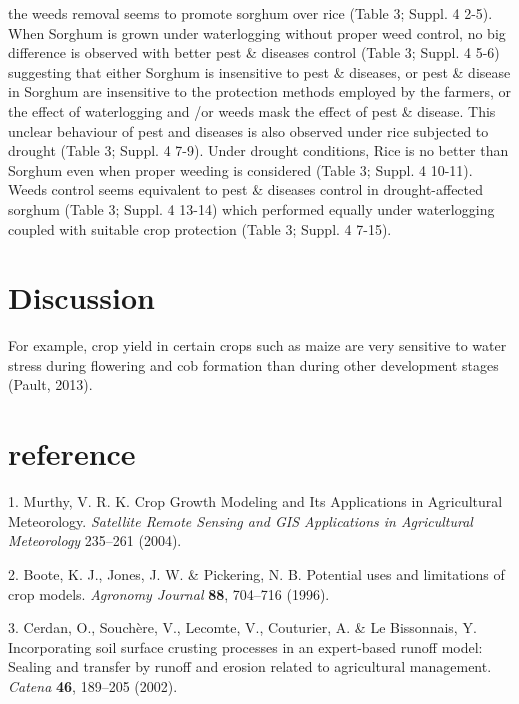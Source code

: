 \documentclass[12pt,oneside]{article}
\begin{document}
the weeds removal seems to promote sorghum over rice (Table 3; Suppl. 4
2-5). When Sorghum is grown under waterlogging without proper weed
control, no big difference is observed with better pest \& diseases
control (Table 3; Suppl. 4 5-6) suggesting that either Sorghum is
insensitive to pest \& diseases, or pest \& disease in Sorghum are
insensitive to the protection methods employed by the farmers, or the
effect of waterlogging and /or weeds mask the effect of pest \& disease.
This unclear behaviour of pest and diseases is also observed under rice
subjected to drought (Table 3; Suppl. 4 7-9). Under drought conditions,
Rice is no better than Sorghum even when proper weeding is considered
(Table 3; Suppl. 4 10-11). Weeds control seems equivalent to pest \&
diseases control in drought-affected sorghum (Table 3; Suppl. 4 13-14)
which performed equally under waterlogging coupled with suitable crop
protection (Table 3; Suppl. 4 7-15).

\hypertarget{discussion}{%
\section{Discussion}\label{discussion}}

For example, crop yield in certain crops such as maize are very
sensitive to water stress during flowering and cob formation than during
other development stages (Pault, 2013).

\hypertarget{reference}{%
\section*{reference}\label{reference}}

\hypertarget{refs}{}
\leavevmode\hypertarget{ref-Murthy_2004}{}%
1. Murthy, V. R. K. Crop Growth Modeling and Its Applications in
Agricultural Meteorology. \emph{Satellite Remote Sensing and GIS
Applications in Agricultural Meteorology} 235--261 (2004).

\leavevmode\hypertarget{ref-Boote_et_al_1996}{}%
2. Boote, K. J., Jones, J. W. \& Pickering, N. B. Potential uses and
limitations of crop models. \emph{Agronomy Journal} \textbf{88},
704--716 (1996).

\leavevmode\hypertarget{ref-Cerdan_et_al_2002}{}%
3. Cerdan, O., Souchère, V., Lecomte, V., Couturier, A. \& Le
Bissonnais, Y. Incorporating soil surface crusting processes in an
expert-based runoff model: Sealing and transfer by runoff and erosion
related to agricultural management. \emph{Catena} \textbf{46}, 189--205
(2002).
\end{document}
